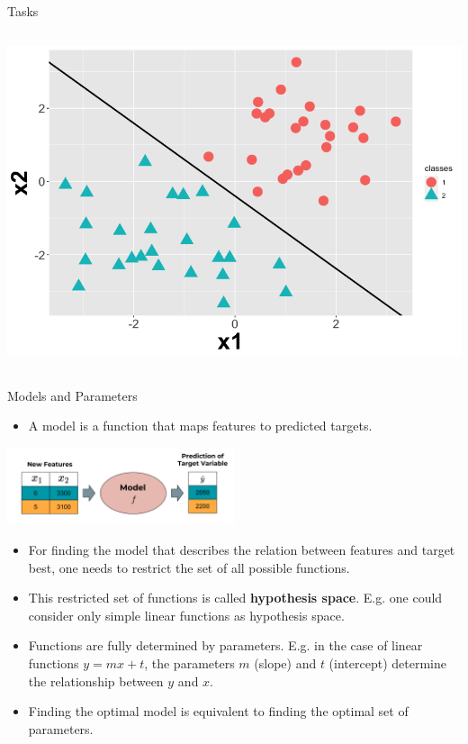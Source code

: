 \documentclass[11pt,compress,t,notes=noshow, xcolor=table]{beamer}
\begin{document}
\begin{vbframe}{Tasks}
\begin{columns}
\begin{column}{0.4\textwidth}
  \begin{center}
    \includegraphics[width=\textwidth]{slides/ml-basics/figure_man/nutshell-ml-basics-supervised-classification-task.png} 
  \end{center}
\end{column}    
\end{columns}    

\end{vbframe}


\begin{vbframe}{Models and Parameters}
\small 
\begin{itemize}
    \item A model is a function that maps features to predicted targets.
\end{itemize}

\begin{center}
  \includegraphics[width = 0.5\textwidth]{figure_man/the_model_web.png} 
\end{center}

\small
\begin{itemize}
\item  For finding the model that describes the relation between features and target best, one needs to restrict the set of all possible functions. 
\item This restricted set of functions is called \textbf{hypothesis space}. E.g. one could consider only simple linear functions as hypothesis space.
\item Functions are fully determined by parameters. E.g. in the case of linear functions $y = mx + t$, the parameters $m$ (slope) and $t$ (intercept) determine the relationship between $y$ and $x$.
\item Finding the optimal model is equivalent to finding the optimal set of parameters.
\end{itemize}

\end{vbframe}
\end{document}
